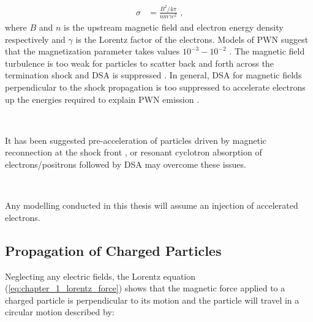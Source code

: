 \begin{equation}
    \begin{aligned}
        \sigma&=\frac{B^2/4\pi}{nm\gamma c^2}\text{ ,}
    \end{aligned}
\end{equation}
\noindent where $B$ and $n$ is the upstream magnetic field and electron energy density respectively and $\gamma$ is the Lorentz factor of the electrons. Models of PWN suggest that the magnetization parameter takes values $10^{-3}-10^{-2}$ \citep{1974MNRAS.167....1R,1984ApJ...283..694K,2004MNRAS.349..779K}. The magnetic field turbulence is too weak for particles to scatter back and forth across the termination shock and DSA is suppressed \citep{2010MNRAS.402..321L,2015SSRv..191..519S}. In general, DSA for magnetic fields perpendicular to the shock propagation is too suppressed to accelerate electrons up the energies required to explain PWN emission \citep{2003APh....19..649M, 2014ApJ...783...91C}.
\par~\par
It has been suggested pre-acceleration of particles driven by magnetic reconnection at the shock front \citep{2001ApJ...547..437L,2003MNRAS.345..153L,2016JPlPh..82d6301L}, or resonant cyclotron absorption of electrons/positrons \cite{2001ApJ...547..437L}  followed by DSA may overcome these issues.
\par~\par
Any modelling conducted in this thesis will assume an injection of accelerated electrons.

\subsection{Propagation of Charged Particles} \label{chapter_1_cr_propagation}

Neglecting any electric fields, the Lorentz equation (\autoref{eq:chapter_1_lorentz_force}) shows that the magnetic force applied to a charged particle is perpendicular to its motion and the particle will travel in a circular motion described by:

